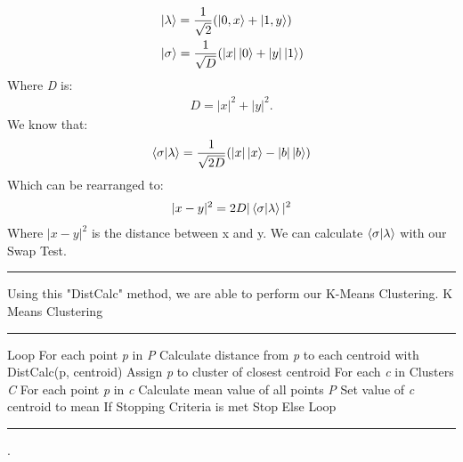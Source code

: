 \documentclass[conference]{IEEEtran}
\begin{document}
\begin{align*}
& \ket{\lambda} = \frac{1}{\sqrt{2}}(\ket{0,x} + \ket{1,y}) \\
& \ket{\sigma} = \frac{1}{\sqrt{D}}(|x|\ket{0} + |y|\ket{1})
\end{align*} 
Where \emph{D} is: 
\begin{align*}
D = |x|^2+|y|^2. 
\end{align*}  
We know that:  
\begin{align*}
 \bra{\sigma}\ket{\lambda} = \frac{1}{\sqrt{2D}}(|x|\ket{x} - |b|\ket{b})
\end{align*} 
Which can be rearranged to: 
\begin{align*}
|x-y|^2 = 2D|\bra{\sigma}\ket{\lambda}|^2
\end{align*} 
Where $|x-y|^2$ is the distance between x and y. We can calculate $\bra{\sigma}\ket{\lambda}$ with our Swap Test. 
\newline
\noindent\rule{\columnwidth}{1pt}
\newline
\indent Using this "DistCalc" method, we are able to perform our K-Means Clustering. \newline
\newline
{\large K Means Clustering} \newline
\noindent\rule{\columnwidth}{1pt}
Loop \newline
\indent For each point \emph{p} in \emph{P} \newline
\indent \indent Calculate distance from \emph{p} to each centroid with \newline 
\indent \indent DistCalc(p, centroid) \newline
\indent \indent Assign \emph{p} to cluster of closest centroid \newline
\indent For each \emph{c} in Clusters \emph{C} \newline
\indent \indent For each point \emph{p} in \emph{c} \newline
\indent \indent \indent Calculate mean value of all points \emph{P} \newline
\indent \indent \indent Set value of \emph{c} centroid to mean \newline
\indent If Stopping Criteria is met \newline
\indent \indent Stop \newline
\indent Else \newline
\indent\indent Loop \newline
\noindent\rule{\columnwidth}{1pt}
\cite{b6}.
\end{document}
